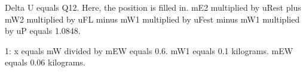 Delta U equals Q12. Here, the position is filled in.  
mE2 multiplied by uRest plus mW2 multiplied by uFL minus mW1 multiplied by uFest minus mW1 multiplied by uP equals 1.0848.  

1: x equals mW divided by mEW equals 0.6.  
mW1 equals 0.1 kilograms.  
mEW equals 0.06 kilograms.